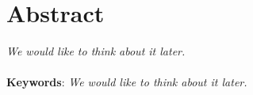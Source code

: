 
\chapter*{Abstract}
\textit{We would like to think about it later.} \\ 
\\ \textbf{Keywords}: \textit{We would like to think about it later.}
\clearpage
